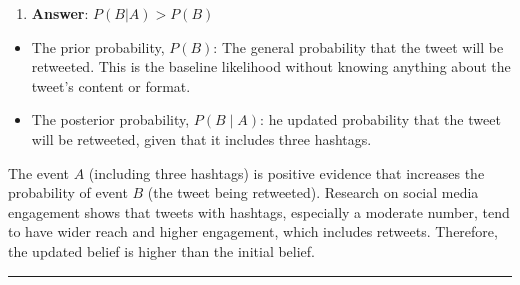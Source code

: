 \documentclass[
  letterpaper,
  DIV=11,
  numbers=noendperiod]{scrartcl}
\providecommand{\tightlist}{%
  \setlength{\itemsep}{0pt}\setlength{\parskip}{0pt}}
\theoremstyle{definition}
\theoremstyle{remark}
\begin{document}
\begin{enumerate}
\def\labelenumi{\alph{enumi})}
\setcounter{enumi}{3}
\tightlist
\item
  \textbf{Answer}: \(P(B|A) > P(B)\)
\end{enumerate}

\begin{itemize}
\item
  The prior probability, \(P(B)\): The general probability that the
  tweet will be retweeted. This is the baseline likelihood without
  knowing anything about the tweet's content or format.
\item
  The posterior probability, \(P(B∣A)\): he updated probability that the
  tweet will be retweeted, given that it includes three hashtags.
\end{itemize}

The event \(A\) (including three hashtags) is positive evidence that
increases the probability of event \(B\) (the tweet being retweeted).
Research on social media engagement shows that tweets with hashtags,
especially a moderate number, tend to have wider reach and higher
engagement, which includes retweets. Therefore, the updated belief is
higher than the initial belief.

\begin{center}\rule{0.5\linewidth}{0.5pt}\end{center}
\end{document}
